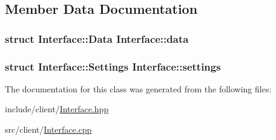 \subsection{Member Data Documentation}
\hypertarget{classInterface_ae0ceef47e2d6be8db4c7ddd85edb059c}{
\subsubsection[{data}]{\setlength{\rightskip}{0pt plus 5cm}struct {\bf Interface\-::\-Data}  Interface\-::data}}\label{classInterface_ae0ceef47e2d6be8db4c7ddd85edb059c}
\hypertarget{classInterface_ac125cb8bbce29de6732096369765dc71}{
\subsubsection[{settings}]{\setlength{\rightskip}{0pt plus 5cm}struct {\bf Interface\-::\-Settings}  Interface\-::settings}}\label{classInterface_ac125cb8bbce29de6732096369765dc71}


The documentation for this class was generated from the following files\-:\begin{DoxyCompactItemize}
\item 
include/client/\hyperlink{Interface_8hpp}{Interface.\-hpp}\item 
src/client/\hyperlink{Interface_8cpp}{Interface.\-cpp}\end{DoxyCompactItemize}
